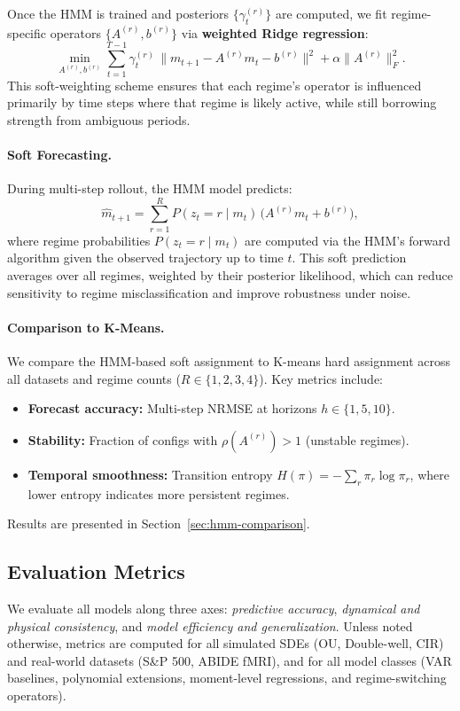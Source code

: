 \documentclass[journal, onecolumn]{IEEEtran}
\begin{document}
Once the HMM is trained and posteriors $\{\gamma_t^{(r)}\}$ are computed, we fit regime-specific operators $\{A^{(r)}, b^{(r)}\}$ via \textbf{weighted Ridge regression}:
\[
\min_{A^{(r)}, b^{(r)}} \sum_{t=1}^{T-1} \gamma_t^{(r)} \, \big\| m_{t+1} - A^{(r)} m_t - b^{(r)} \big\|^2 + \alpha \|A^{(r)}\|_F^2.
\]
This soft-weighting scheme ensures that each regime's operator is influenced primarily by time steps where that regime is likely active, while still borrowing strength from ambiguous periods.

\paragraph{Soft Forecasting.}
During multi-step rollout, the HMM model predicts:
\[
\hat{m}_{t+1} = \sum_{r=1}^R P(z_t = r \mid m_t) \, \big( A^{(r)} m_t + b^{(r)} \big),
\]
where regime probabilities $P(z_t = r \mid m_t)$ are computed via the HMM's forward algorithm given the observed trajectory up to time $t$. This soft prediction averages over all regimes, weighted by their posterior likelihood, which can reduce sensitivity to regime misclassification and improve robustness under noise.

\paragraph{Comparison to K-Means.}
We compare the HMM-based soft assignment to K-means hard assignment across all datasets and regime counts ($R \in \{1,2,3,4\}$). Key metrics include:
\begin{itemize}
    \item \textbf{Forecast accuracy:} Multi-step NRMSE at horizons $h \in \{1, 5, 10\}$.
    \item \textbf{Stability:} Fraction of configs with $\rho(A^{(r)}) > 1$ (unstable regimes).
    \item \textbf{Temporal smoothness:} Transition entropy $H(\pi) = -\sum_r \pi_r \log \pi_r$, where lower entropy indicates more persistent regimes.
\end{itemize}
Results are presented in Section~\ref{sec:hmm-comparison}.


\subsection{Evaluation Metrics}
\label{sec:evaluation}

We evaluate all models along three axes: \textit{predictive accuracy},
\textit{dynamical and physical consistency}, and \textit{model efficiency and
generalization}. Unless noted otherwise, metrics are computed for all simulated
SDEs (OU, Double-well, CIR) and real-world datasets (S\&P 500, ABIDE fMRI), and
for all model classes (VAR baselines, polynomial extensions, moment-level
regressions, and regime-switching operators).
\end{document}
